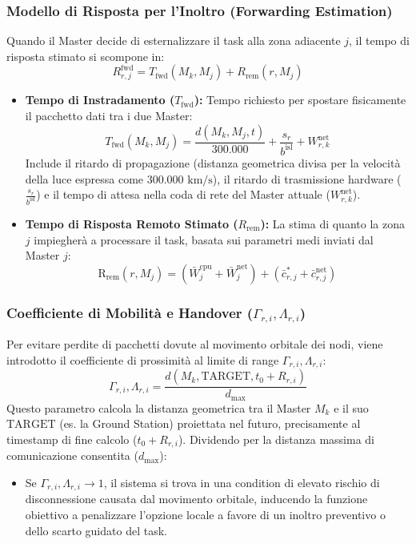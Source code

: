 \documentclass[12pt]{article}
\begin{document}
\subsubsection{Modello di Risposta per l'Inoltro (Forwarding Estimation)}
Quando il Master decide di esternalizzare il task alla zona adiacente $j$, il tempo di risposta stimato si scompone in:
\begin{equation}
R_{r,j}^{\text{fwd}} = T_{\text{fwd}}(M_k, M_j) + R_{\text{rem}}(r, M_j)
\end{equation}
\begin{itemize}
    \item \textbf{Tempo di Instradamento ($T_{\text{fwd}}$):} Tempo richiesto per spostare fisicamente il pacchetto dati tra i due Master:
    \begin{equation}
    T_{\text{fwd}}(M_k, M_j) = \frac{d(M_k, M_j, t)}{300.000} + \frac{s_r}{b^{\text{isl}}} + W_{r,k}^{\text{net}}
    \end{equation}
    Include il ritardo di propagazione (distanza geometrica divisa per la velocit\`a della luce espressa come $300.000 \text{ km/s}$), il ritardo di trasmissione hardware ($\frac{s_r}{b^{\text{isl}}}$) e il tempo di attesa nella coda di rete del Master attuale ($W_{r,k}^{\text{net}}$).
    
    \item \textbf{Tempo di Risposta Remoto Stimato ($R_{\text{rem}}$):} La stima di quanto la zona $j$ impiegher\`a a processare il task, basata sui parametri medi inviati dal Master $j$:
    \begin{equation}
    \text{R}_{\text{rem}}(r, M_j) = \left( \bar{W}_j^{\text{cpu}} + \bar{W}_j^{\text{net}} \right) + \left( \bar{c}_{r,j}^* + \bar{c}_{r,j}^{\text{net}} \right)
    \end{equation}
\end{itemize}

\subsubsection{Coefficiente di Mobilit\`a e Handover ($\Gamma_{r,i} , \Lambda_{r,i}$)}
Per evitare perdite di pacchetti dovute al movimento orbitale dei nodi, viene introdotto il coefficiente di prossimit\`a al limite di range $\Gamma_{r,i}, \Lambda_{r,i}$:
\begin{equation}
\Gamma_{r,i} , \Lambda_{r,i} = \frac{d(M_k, \text{TARGET}, t_0 + R_{r,i})}{d_{\text{max}}}
\end{equation}
Questo parametro calcola la distanza geometrica tra il Master $M_k$ e il suo $\text{TARGET}$ (es. la Ground Station) proiettata nel futuro, precisamente al timestamp di fine calcolo ($t_0 + R_{r,i}$). Dividendo per la distanza massima di comunicazione consentita ($d_{\text{max}}$):
\begin{itemize}
    \item Se $\Gamma_{r,i} , \Lambda_{r,i} \to 1$, il sistema si trova in una condition di elevato rischio di disconnessione causata dal movimento orbitale, inducendo la funzione obiettivo a penalizzare l'opzione locale a favore di un inoltro preventivo o dello scarto guidato del task.
\end{itemize}
\end{document}

